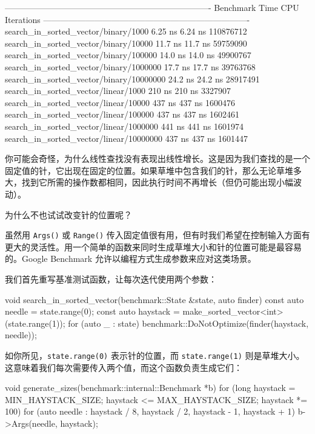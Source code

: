 \begin{codebox}[text]
-------------------------------------------------------------------------
Benchmark                                 Time        CPU     Iterations
-------------------------------------------------------------------------
search_in_sorted_vector/binary/1000           6.25 ns         6.24 ns    110876712
search_in_sorted_vector/binary/10000          11.7 ns         11.7 ns     59759090
search_in_sorted_vector/binary/100000         14.0 ns         14.0 ns     49900767
search_in_sorted_vector/binary/1000000        17.7 ns         17.7 ns     39763768
search_in_sorted_vector/binary/10000000       24.2 ns         24.2 ns     28917491
search_in_sorted_vector/linear/1000            210 ns          210 ns      3327907
search_in_sorted_vector/linear/10000           437 ns          437 ns      1600476
search_in_sorted_vector/linear/100000          437 ns          437 ns      1602461
search_in_sorted_vector/linear/1000000         441 ns          441 ns      1601974
search_in_sorted_vector/linear/10000000        437 ns          437 ns      1601447
\end{codebox}

\label{idx:1172}
你可能会奇怪，为什么线性查找没有表现出线性增长。这是因为我们查找的是一个固定值的针，它出现在固定的位置。如果草堆中包含我们的针，那么无论草堆多大，找到它所需的操作数都相同，因此执行时间不再增长（但仍可能出现小幅波动）。

为什么不也试试改变针的位置呢？

虽然用 \texttt{Args()} 或 \texttt{Range()} 传入固定值很有用，但有时我们希望在控制输入方面有更大的灵活性。用一个简单的函数来同时生成草堆大小和针的位置可能是最容易的。Google Benchmark 允许以编程方式生成参数来应对这类场景。

我们首先重写基准测试函数，让每次迭代使用两个参数：

\begin{codebox}[text]
void search_in_sorted_vector(benchmark::State &state, auto finder) {
  const auto needle = state.range(0);
  const auto haystack = make_sorted_vector<int>(state.range(1));
  for (auto _ : state) {
    benchmark::DoNotOptimize(finder(haystack, needle));
  }
}
\end{codebox}

如你所见，\texttt{state.\allowbreak{}range(\allowbreak{}0)\allowbreak{}} 表示针的位置，而 \texttt{state.\allowbreak{}range(\allowbreak{}1)\allowbreak{}} 则是草堆大小。这意味着我们每次需要传入两个值，而这个函数负责生成它们：

\begin{codebox}[text]
void generate_sizes(benchmark::internal::Benchmark *b) {
  for (long haystack = MIN_HAYSTACK_SIZE; haystack <= MAX_HAYSTACK_SIZE;
       haystack *= 100) {
    for (auto needle :
         {haystack / 8, haystack / 2, haystack - 1, haystack + 1}) {
      b->Args({needle, haystack});
    }
  }
}
\end{codebox}

